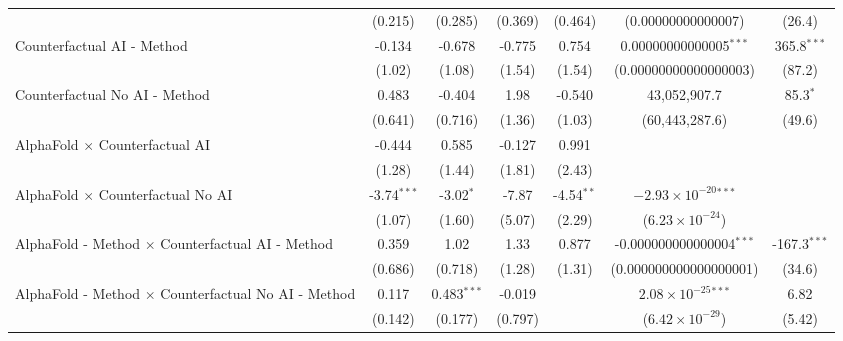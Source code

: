 \begin{tabular}{lcccccc}
                                                              & (0.215)       & (0.285)        & (0.369) & (0.464)      & (0.00000000000007)              & (26.4)\\   
   Counterfactual AI - Method                                 & -0.134        & -0.678         & -0.775  & 0.754        & 0.00000000000005$^{***}$        & 365.8$^{***}$\\   
                                                              & (1.02)        & (1.08)         & (1.54)  & (1.54)       & (0.00000000000000003)           & (87.2)\\   
   Counterfactual No AI - Method                              & 0.483         & -0.404         & 1.98    & -0.540       & 43,052,907.7                    & 85.3$^{*}$\\   
                                                              & (0.641)       & (0.716)        & (1.36)  & (1.03)       & (60,443,287.6)                  & (49.6)\\   
   AlphaFold $\times$ Counterfactual AI                       & -0.444        & 0.585          & -0.127  & 0.991        &                                 &   \\   
                                                              & (1.28)        & (1.44)         & (1.81)  & (2.43)       &                                 &   \\   
   AlphaFold $\times$ Counterfactual No AI                    & -3.74$^{***}$ & -3.02$^{*}$    & -7.87   & -4.54$^{**}$ & $-2.93\times 10^{-20}$$^{***}$  &   \\   
                                                              & (1.07)        & (1.60)         & (5.07)  & (2.29)       & ($6.23\times 10^{-24}$)         &   \\   
   AlphaFold - Method $\times$ Counterfactual AI - Method     & 0.359         & 1.02           & 1.33    & 0.877        & -0.000000000000004$^{***}$      & -167.3$^{***}$\\   
                                                              & (0.686)       & (0.718)        & (1.28)  & (1.31)       & (0.000000000000000001)          & (34.6)\\   
   AlphaFold - Method $\times$ Counterfactual No AI - Method  & 0.117         & 0.483$^{***}$  & -0.019  &              & $2.08\times 10^{-25}$$^{***}$   & 6.82\\   
                                                              & (0.142)       & (0.177)        & (0.797) &              & ($6.42\times 10^{-29}$)         & (5.42)\\   

\end{tabular}
